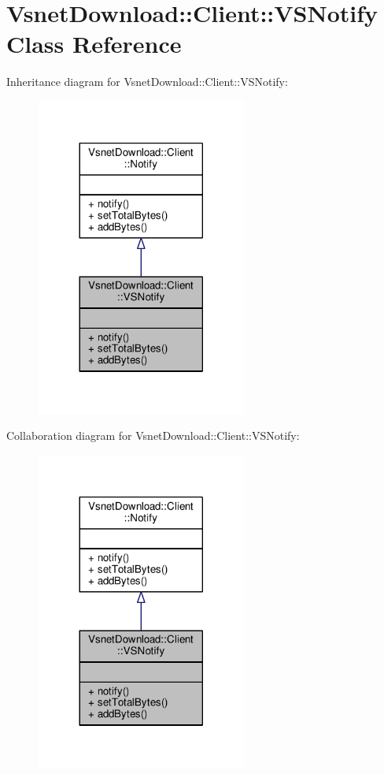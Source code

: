 \hypertarget{classVsnetDownload_1_1Client_1_1VSNotify}{}\section{Vsnet\+Download\+:\+:Client\+:\+:V\+S\+Notify Class Reference}
\label{classVsnetDownload_1_1Client_1_1VSNotify}


Inheritance diagram for Vsnet\+Download\+:\+:Client\+:\+:V\+S\+Notify\+:
\nopagebreak
\begin{figure}[H]
\begin{center}
\leavevmode
\includegraphics[width=197pt]{d0/d7c/classVsnetDownload_1_1Client_1_1VSNotify__inherit__graph}
\end{center}
\end{figure}


Collaboration diagram for Vsnet\+Download\+:\+:Client\+:\+:V\+S\+Notify\+:
\nopagebreak
\begin{figure}[H]
\begin{center}
\leavevmode
\includegraphics[width=197pt]{d7/d65/classVsnetDownload_1_1Client_1_1VSNotify__coll__graph}
\end{center}
\end{figure}
